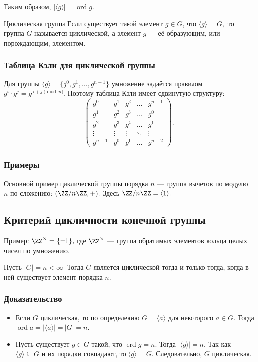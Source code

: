 Таким образом, $|\langle g \rangle| = \operatorname{ord} g.$

\begin{Definition}{Циклическая группа}{}
	Если существует такой элемент $g \in G$, что $\langle g \rangle = G,$
	то группа $G$ называется циклической, а элемент $g$ — её образующим, или порождающим, элементом.
\end{Definition}

\subsubsection*{Таблица Кэли для циклической группы}

Для группы $\langle g \rangle = \{g^0,g^1,\dots,g^{n-1}\}$
умножение задаётся правилом $g^i \cdot g^j = g^{\,i+j \pmod n}.$
Поэтому таблица Кэли имеет сдвинутую структуру:
\[
\begin{pmatrix}
	g^0 & g^1 & g^2 & \dots & g^{n-1} \\
	g^1 & g^2 & g^3 & \dots & g^0 \\
	g^2 & g^3 & g^4 & \dots & g^1 \\
	\vdots & \vdots & \vdots & \ddots & \vdots \\
	g^{n-1} & g^0 & g^1 & \dots & g^{n-2}
\end{pmatrix}.
\]

\subsubsection*{Примеры}

Основной пример циклической группы порядка $n$ — группа вычетов по модулю $n$ по сложению: $(\ZZ/n\ZZ, +).$
Здесь $\ZZ/n\ZZ = \langle \bar{1} \rangle.$

\subsection{Критерий цикличности конечной группы}

Пример: $\ZZ^\times = \{\pm 1\},$
где $\ZZ^\times$ — группа обратимых элементов кольца целых чисел по умножению.

\begin{Proposition}{}{}
	Пусть $|G| = n < \infty$. Тогда $G$ является циклической тогда и только тогда, когда в ней существует элемент порядка $n$.
\end{Proposition}

\subsubsection*{Доказательство}

\begin{itemize}
	\item[$\Rightarrow$)] Если $G$ циклическая, то по определению $G = \langle a \rangle$ для некоторого $a \in G$. Тогда $\operatorname{ord} a = |\langle a \rangle| = |G| = n.$
	
	\item[$\Leftarrow$)] Пусть существует $g \in G$ такой, что $\operatorname{ord} g = n$. Тогда $|\langle g \rangle| = n.$
	Так как $\langle g \rangle \subseteq G$ и их порядки совпадают, то $\langle g \rangle = G.$
	Следовательно, $G$ циклическая.
\end{itemize}
